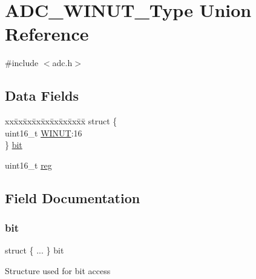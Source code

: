 \hypertarget{union_a_d_c___w_i_n_u_t___type}{}\section{A\+D\+C\+\_\+\+W\+I\+N\+U\+T\+\_\+\+Type Union Reference}
\label{union_a_d_c___w_i_n_u_t___type}


{\ttfamily \#include $<$adc.\+h$>$}

\subsection*{Data Fields}
\begin{DoxyCompactItemize}
\item 
\begin{tabbing}
xx\=xx\=xx\=xx\=xx\=xx\=xx\=xx\=xx\=\kill
struct \{\\
\>uint16\_t \mbox{\hyperlink{union_a_d_c___w_i_n_u_t___type_a00364f26fde23e6a2331183c1aa8f876}{WINUT}}:16\\
\} \mbox{\hyperlink{union_a_d_c___w_i_n_u_t___type_aefac625dff688ff429b9b30d49d70531}{bit}}\\

\end{tabbing}\item 
uint16\+\_\+t \mbox{\hyperlink{union_a_d_c___w_i_n_u_t___type_a11760f5020019f4aa8cb02e694f7cc44}{reg}}
\end{DoxyCompactItemize}


\subsection{Field Documentation}
\mbox{\label{union_a_d_c___w_i_n_u_t___type_aefac625dff688ff429b9b30d49d70531}} 
\subsubsection{\texorpdfstring{bit}{bit}}
{\footnotesize\ttfamily struct \{ ... \}   bit}

Structure used for bit access \mbox{\label{union_a_d_c___w_i_n_u_t___type_a11760f5020019f4aa8cb02e694f7cc44}} 
